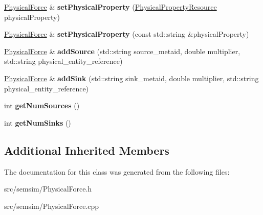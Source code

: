 \begin{DoxyCompactItemize}
\mbox{\label{classsemsim_1_1PhysicalForce_a5a83ae2458a89151ed7990ba75251318}} 
\hyperlink{classsemsim_1_1PhysicalForce}{Physical\+Force} \& {\bfseries set\+Physical\+Property} (\hyperlink{classsemsim_1_1PhysicalPropertyResource}{Physical\+Property\+Resource} physical\+Property)
\item 
\mbox{\label{classsemsim_1_1PhysicalForce_a684767a1350eab54b403c5b1dd0cb20a}} 
\hyperlink{classsemsim_1_1PhysicalForce}{Physical\+Force} \& {\bfseries set\+Physical\+Property} (const std\+::string \&physical\+Property)
\item 
\mbox{\label{classsemsim_1_1PhysicalForce_afe234b09ac757b4cf3561f8d3cbf4c0b}} 
\hyperlink{classsemsim_1_1PhysicalForce}{Physical\+Force} \& {\bfseries add\+Source} (std\+::string source\+\_\+metaid, double multiplier, std\+::string physical\+\_\+entity\+\_\+reference)
\item 
\mbox{\label{classsemsim_1_1PhysicalForce_a0886647a9a7efd80bb99f6ce74bcb76a}} 
\hyperlink{classsemsim_1_1PhysicalForce}{Physical\+Force} \& {\bfseries add\+Sink} (std\+::string sink\+\_\+metaid, double multiplier, std\+::string physical\+\_\+entity\+\_\+reference)
\item 
\mbox{\label{classsemsim_1_1PhysicalForce_ad94974c799d17e5f6376391b1f3a7444}} 
int {\bfseries get\+Num\+Sources} ()
\item 
\mbox{\label{classsemsim_1_1PhysicalForce_ab947284af190941616ae8a6f1de2a85d}} 
int {\bfseries get\+Num\+Sinks} ()
\end{DoxyCompactItemize}
\subsection*{Additional Inherited Members}


The documentation for this class was generated from the following files\+:\begin{DoxyCompactItemize}
\item 
src/semsim/Physical\+Force.\+h\item 
src/semsim/Physical\+Force.\+cpp\end{DoxyCompactItemize}
